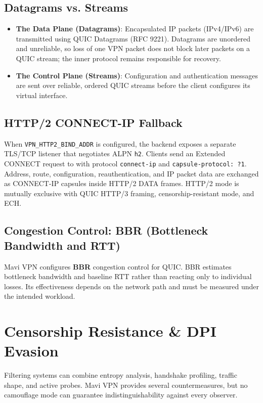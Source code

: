 \documentclass[11pt,a4paper]{article}
\begin{document}
\subsection{Datagrams vs. Streams}
\begin{itemize}
    \item \textbf{The Data Plane (Datagrams)}: Encapsulated IP packets (IPv4/IPv6) are transmitted using QUIC Datagrams (RFC 9221). Datagrams are unordered and unreliable, so loss of one VPN packet does not block later packets on a QUIC stream; the inner protocol remains responsible for recovery.
    \item \textbf{The Control Plane (Streams)}: Configuration and authentication messages are sent over reliable, ordered QUIC streams before the client configures its virtual interface.
\end{itemize}

\subsection{HTTP/2 CONNECT-IP Fallback}
When \texttt{VPN\_HTTP2\_BIND\_ADDR} is configured, the backend exposes a separate
TLS/TCP listener that negotiates ALPN \texttt{h2}. Clients send an Extended CONNECT
request to  with protocol \texttt{connect-ip}
and \texttt{capsule-protocol: ?1}. Address, route, configuration, reauthentication,
and IP packet data are exchanged as CONNECT-IP capsules inside HTTP/2 DATA frames.
HTTP/2 mode is mutually exclusive with QUIC HTTP/3 framing, censorship-resistant
mode, and ECH.

\subsection{Congestion Control: BBR (Bottleneck Bandwidth and RTT)}
Mavi VPN configures \textbf{BBR} congestion control for QUIC. BBR estimates bottleneck bandwidth and baseline RTT rather than reacting only to individual losses. Its effectiveness depends on the network path and must be measured under the intended workload.

\section{Censorship Resistance \& DPI Evasion}

Filtering systems can combine entropy analysis, handshake profiling, traffic shape, and active probes. Mavi VPN provides several countermeasures, but no camouflage mode can guarantee indistinguishability against every observer.
\end{document}

